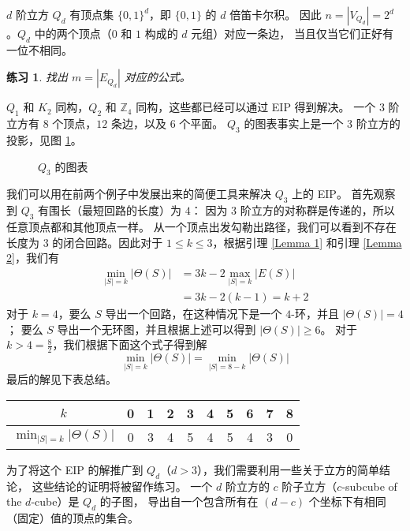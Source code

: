 \documentclass[12pt, a4paper]{article}
\newtheorem{exercise}{练习}
\begin{document}
$d$ 阶立方 $Q_d$ 有顶点集 $\{0, 1\}^d$，即 $\{0, 1\}$ 的 $d$ 倍笛卡尔积。
因此 $n = |V_{Q_d}| = 2^d$。$Q_d$ 中的两个顶点（$0$ 和 $1$ 构成的 $d$ 元组）对应一条边，
当且仅当它们正好有一位不相同。

\begin{exercise}
\label{Exercise 2}
找出 $m = |E_{Q_d}|$ 对应的公式。
\end{exercise}

$Q_1$ 和 $K_2$ 同构，$Q_2$ 和 $\mathbb{Z}_4$ 同构，这些都已经可以通过 EIP 得到解决。
一个 $3$ 阶立方有 $8$ 个顶点，$12$ 条边，以及 $6$ 个平面。
$Q_3$ 的图表事实上是一个 $3$ 阶立方的投影，见图 \ref{Figure 2}。

\begin{figure}
	\centering
	
	\caption{$Q_3$ 的图表}
	\label{Figure 2}
\end{figure}

我们可以用在前两个例子中发展出来的简便工具来解决 $Q_3$ 上的 EIP。
首先观察到 $Q_3$ 有围长（最短回路的长度）为 $4$：
因为 $3$ 阶立方的对称群是传递的，所以任意顶点都和其他顶点一样。
从一个顶点出发勾勒出路径，我们可以看到不存在长度为 $3$ 的闭合回路。因此对于
$1 \le k \le 3$，根据引理 \ref{Lemma 1} 和引理 \ref{Lemma 2}，我们有
\begin{align*}
\min_{|S| = k} |\Theta(S)| & = 3 k - 2 \max_{|S| = k} |E(S)| \\
			   & = 3 k - 2 (k - 1) = k + 2
\end{align*}
对于 $k = 4$，要么 $S$ 导出一个回路，在这种情况下是一个 $4$-环，并且 $|\Theta(S)| = 4$；
要么 $S$ 导出一个无环图，并且根据上述可以得到 $|\Theta(S)| \ge 6$。
对于 $k > 4 = \frac{8}{2}$，我们根据下面这个式子得到解
\begin{equation*}
\min_{|S| = k} |\Theta(S)| = \min_{|S| = 8 - k} |\Theta(S)|
\end{equation*}
最后的解见下表总结。
\begin{center}
	\begin{tabular}{ c | c c c c c c c c c }
	$k$                          & 0 & 1 & 2 & 3 & 4 & 5 & 6 & 7 & 8 \\
	\hline
	$\min_{|S| = k} |\Theta(S)|$ & 0 & 3 & 4 & 5 & 4 & 5 & 4 & 3 & 0
	\end{tabular}
\end{center}

为了将这个 EIP 的解推广到 $Q_d$（$d > 3$），我们需要利用一些关于立方的简单结论，
这些结论的证明将被留作练习。
一个 $d$ 阶立方的 $c$ 阶子立方（$c$-subcube of the $d$-cube）是 $Q_d$ 的子图，
导出自一个包含所有在 $(d − c)$ 个坐标下有相同（固定）值的顶点的集合。
\end{document}
